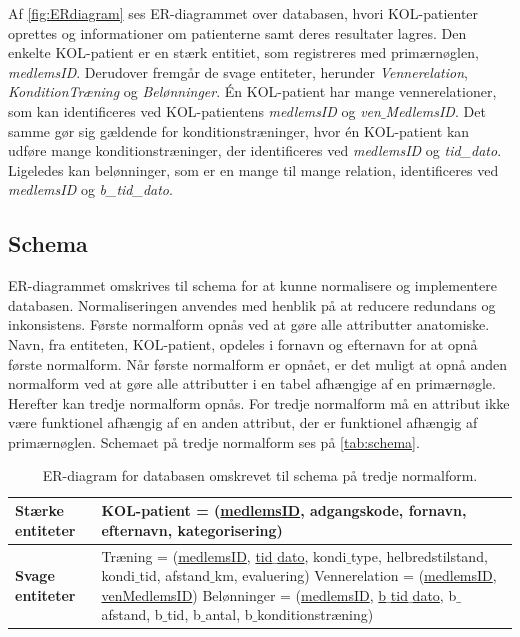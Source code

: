 \noindent
Af \autoref{fig:ERdiagram} ses ER-diagrammet over databasen, hvori KOL-patienter oprettes og informationer om patienterne samt deres resultater lagres. Den enkelte KOL-patient er en stærk entitiet, som registreres med primærnøglen, \textit{medlemsID}. Derudover fremgår de svage entiteter, herunder \textit{Vennerelation}, \textit{KonditionTræning} og \textit{Belønninger}. Én KOL-patient har mange vennerelationer, som kan identificeres ved KOL-patientens \textit{medlemsID} og \textit{ven$\_$MedlemsID}. Det samme gør sig gældende for konditionstræninger, hvor én KOL-patient kan udføre mange konditionstræninger, der identificeres ved \textit{medlemsID} og \textit{tid\_dato}. Ligeledes kan belønninger, som er en mange til mange relation, identificeres ved \textit{medlemsID} og \textit{b\_tid\_dato}.

\subsection*{Schema}
ER-diagrammet omskrives til schema for at kunne normalisere og implementere databasen. Normaliseringen anvendes med henblik på at reducere redundans og inkonsistens.
Første normalform opnås ved at gøre alle attributter anatomiske. Navn, fra entiteten, KOL-patient, opdeles i fornavn og efternavn for at opnå første normalform. Når første normalform er opnået, er det muligt at opnå anden normalform ved at gøre alle attributter i en tabel afhængige af en primærnøgle. Herefter kan tredje normalform opnås. For tredje normalform må en attribut ikke være funktionel afhængig af en anden attribut, der er funktionel afhængig af primærnøglen. Schemaet på tredje normalform ses på \autoref{tab:schema}.

\begin{table} [H]
	\centering
  \begin{tabular}{ | l | p{12cm} |} \hline
     \textbf{Stærke entiteter} & KOL-patient = (\underline{medlemsID}, adgangskode, fornavn, efternavn, kategorisering) \\ \hline
 	\textbf{Svage entiteter} & Træning = (\underline{medlemsID}, \underline{tid$\_$dato}, kondi$\_$type, helbredstilstand, kondi$\_$tid, afstand$\_$km, evaluering)
 \newline Vennerelation = (\underline{medlemsID}, \underline{venMedlemsID})
\newline Belønninger = (\underline{medlemsID}, \underline{b$\_$tid$\_$dato}, b$\_$afstand, b$\_$tid, b$\_$antal, b$\_$konditionstræning)\\ \hline
    \end{tabular}
    \caption{ER-diagram for databasen omskrevet til schema på tredje normalform.}
    \label{tab:schema}
\end{table}

